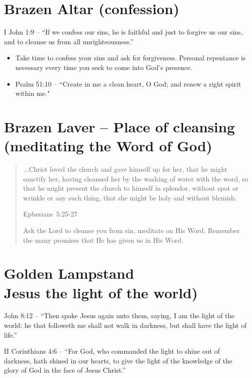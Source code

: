 \section{Brazen Altar (confession)}

I John 1:9 – “If we confess our sins, he is faithful and just to forgive us our sins, and to cleanse us from all unrighteousness.”

\begin{itemize}
\item Take time to confess your sins and ask for forgiveness. Personal repentance is necessary every time you seek to come into God’s presence.
\item Psalm 51:10 – “Create in me a clean heart, O God; and renew a right spirit within me."
\end{itemize}


\section{Brazen Laver – Place of cleansing (meditating the Word of God)}



\begin{quote}
...Christ loved the church and gave himself up for her, that he might sanctify her, having cleansed her by the washing of water with the word, so that he might present the church to himself in splendor, without spot or wrinkle or any such thing, that she might be holy and without blemish.

\raggedleft\small Ephesians~5:25-27

Ask the Lord to cleanse you from sin, meditate on His Word. Remember the many promises that He has given us in His Word.
\end{quote}



\section{Golden Lampstand\\Jesus the light of the world)}

John 8:12 – “Then spake Jesus again unto them, saying, I am the light of the world: he that followeth me shall not walk in darkness, but shall have the light of life.”

II Corinthians 4:6 – “For God, who commanded the light to shine out of darkness, hath shined in our hearts, to give the light of the knowledge of the glory of God in the face of Jesus Christ.”

